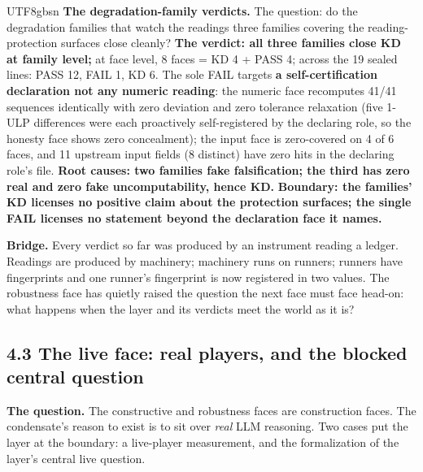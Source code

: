 \documentclass[11pt,letterpaper]{article}
\begin{document}
\begin{CJK}{UTF8}{gbsn}
\textbf{The degradation-family verdicts.} The question: do the degradation families that watch the readings \textemdash{} three families covering the reading-protection surfaces \textemdash{} close cleanly? \textbf{The verdict: all three families close KD at family level;} at face level, 8 faces = KD 4 + PASS 4; across the 19 sealed lines: PASS 12, FAIL 1, KD 6. The sole FAIL targets \textbf{a self-certification declaration \textemdash{} not any numeric reading}: the numeric face recomputes 41/41 sequences identically with zero deviation and zero tolerance relaxation (five 1-ULP differences were each proactively self-registered by the declaring role, so the honesty face shows zero concealment); the input face is zero-covered on 4 of 6 faces, and 11 upstream input fields (8 distinct) have zero hits in the declaring role's file. \textbf{Root causes: two families fake falsification; the third has zero real and zero fake \textemdash{} uncomputability, hence KD.} \textbf{Boundary: the families' KD licenses no positive claim about the protection surfaces; the single FAIL licenses no statement beyond the declaration face it names.}

\textbf{Bridge.} Every verdict so far was produced by an instrument reading a ledger. Readings are produced by machinery; machinery runs on runners; runners have fingerprints \textemdash{} and one runner's fingerprint is now registered in two values. The robustness face has quietly raised the question the next face must face head-on: what happens when the layer and its verdicts meet the world as it is?

\subsection*{4.3 The live face: real players, and the blocked central question}

\textbf{The question.} The constructive and robustness faces are construction faces. The condensate's reason to exist is to sit over \emph{real} LLM reasoning. Two cases put the layer at the boundary: a live-player measurement, and the formalization of the layer's central live question.


\end{CJK}
\end{document}
